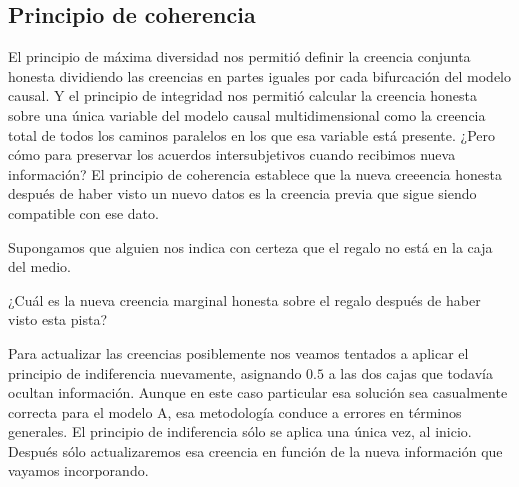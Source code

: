 \documentclass[a4paper,10pt]{book}
\theoremstyle{definition}
\begin{document}
\subsection{Principio de coherencia} %

El principio de máxima diversidad nos permitió definir la creencia conjunta honesta dividiendo las creencias en partes iguales por cada bifurcación del modelo causal.
Y el principio de integridad nos permitió calcular la creencia honesta sobre una única variable del modelo causal multidimensional como la creencia total de todos los caminos paralelos en los que esa variable está presente.
¿Pero cómo para preservar los acuerdos intersubjetivos cuando recibimos nueva información?
El principio de coherencia establece que la nueva creeencia honesta después de haber visto un nuevo datos es la creencia previa que sigue siendo compatible con ese dato.


Supongamos que alguien nos indica con certeza que el regalo no está en la caja del medio.
%
\begin{figure}[ht!]
\centering
{} 
\end{figure}

¿Cuál es la nueva creencia marginal honesta sobre el regalo después de haber visto esta pista?

Para actualizar las creencias posiblemente nos veamos tentados a aplicar el principio de indiferencia nuevamente, asignando $0.5$ a las dos cajas que todavía ocultan información.
%
Aunque en este caso particular esa solución sea casualmente correcta para el modelo A, esa metodología conduce a errores en términos generales.
%
El principio de indiferencia sólo se aplica una única vez, al inicio.
%
Después sólo actualizaremos esa creencia en función de la nueva información que vayamos incorporando.
\end{document}
